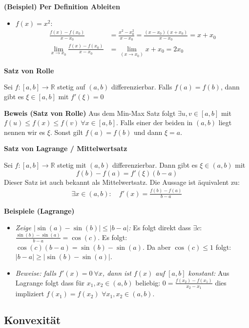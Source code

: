 \documentclass[25pt]{sciposter}
\newcommand{\R}{\mathbb{R}}
\newenvironment{method}[1]{\begin{mdframed}[backgroundcolor=blue!10,innertopmargin=15pt, innerbottommargin=15pt]
		\textbf{#1 }
	}
	{ 
	\end{mdframed}
}
\begin{document}
\begin{multicols}{3}
\textbf{(Beispiel) Per Definition Ableiten}

\begin{itemize}
	\item $f(x) = x^2$:
	\begin{align*}
		\frac{f(x) - f(x_0)}{x-x_0} &= 	\frac{x^2 - x_{0}^2}{x-x_0} = \frac{(x-x_0) (x+x_0)}{x-x_0} = x + x_0\\
		\lim_{x \to x_0} \frac{f(x)-f(x_0)}{x-x_0} &= \lim_{(x\to x_0)} x + x_0 = 2x_0
	\end{align*}
\end{itemize}



\begin{method}{Satz von Rolle}
	Sei $f: [a,b] \to \R$ stetig auf $(a,b)$ differenzierbar. Falls $f(a) = f(b)$, dann gibt es $\xi \in [a,b]$ mit $f'(\xi) = 0$
\end{method}
\textbf{Beweis (Satz von Rolle)} Aus dem Min-Max Satz folgt $\exists u,v \in [a,b]$ mit $f(u) \leq f(x) \leq f(v) \ \forall x \in [a,b]$. Falls einer der beiden in $(a,b)$ liegt nennen wir es $\xi$. Sonst gilt $f(a) = f(b)$ und dann $\xi = a$.


\begin{method}{Satz von Lagrange / Mittelwertsatz}
	Sei $f:[a,b] \to \R$ stetig mit $(a,b)$ differenzierbar. Dann gibt es $\xi \in (a,b)$ mit $$f(b) - f(a) = f'(\xi) (b-a)$$
	Dieser Satz ist auch bekannt als Mittelwertsatz. Die Aussage ist äquivalent zu: 
	\begin{align*}
		\exists x \in (a,b) : \quad f'(x) = \frac{f(b) -f(a) }{b-a}
	\end{align*}
\end{method}
\textbf{Beispiele (Lagrange)}
\begin{itemize}
	\item \textit{Zeige $|\sin(a) - \sin(b)| \leq |b-a|$:} Es folgt direkt dass $\exists c$: $\frac{\sin(b)- \sin(a)}{b-a} = \cos(c)$. Es folgt: $\cos(c) (b-a) = \sin(b) - \sin(a)$. Da aber $\cos(c) \leq 1$ folgt:
	$|b-a| \geq |\sin(b) - \sin(a)|$.
	\item \textit{Beweise: falls $f'(x) = 0 \ \forall x$, dann ist $f(x)$ auf $[a,b]$ konstant:} Aus Lagrange folgt dass für $x_1,x_2\in (a,b)$ beliebig: $0 = \frac{f(x_2)-f(x_1)}{x_2-x_1}$ dies impliziert $f(x_1) = f(x_2)$ $\forall x_1,x_2 \in (a,b)$.
\end{itemize}

\subsection*{Konvexität}


\end{multicols}
\end{document}
